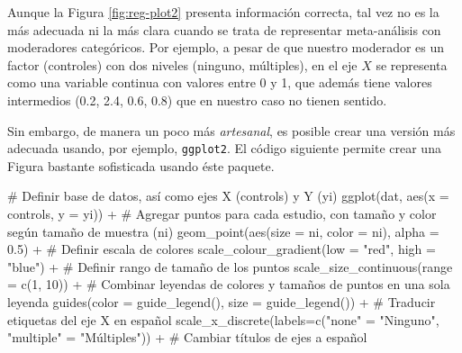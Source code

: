 \documentclass[
  bookmarksnumbered]{article}
\newenvironment{Shaded}{\begin{snugshade}}{\end{snugshade}}
\newcommand{\AttributeTok}[1]{\textcolor[rgb]{0.00,0.34,0.68}{#1}}
\newcommand{\CommentTok}[1]{\textcolor[rgb]{0.54,0.53,0.53}{#1}}
\newcommand{\DecValTok}[1]{\textcolor[rgb]{0.69,0.50,0.00}{#1}}
\newcommand{\FloatTok}[1]{\textcolor[rgb]{0.69,0.50,0.00}{#1}}
\newcommand{\FunctionTok}[1]{\textcolor[rgb]{0.39,0.29,0.61}{#1}}
\newcommand{\NormalTok}[1]{\textcolor[rgb]{0.12,0.11,0.11}{#1}}
\newcommand{\OtherTok}[1]{\textcolor[rgb]{0.00,0.43,0.16}{#1}}
\newcommand{\SpecialCharTok}[1]{\textcolor[rgb]{0.24,0.68,0.91}{#1}}
\newcommand{\StringTok}[1]{\textcolor[rgb]{0.75,0.01,0.01}{#1}}
\begin{document}
Aunque la Figura \ref{fig:reg-plot2} presenta información correcta, tal vez no es la más adecuada ni la más clara cuando se trata de representar meta-análisis con moderadores categóricos. Por ejemplo, a pesar de que nuestro moderador es un factor (controles) con dos niveles (ninguno, múltiples), en el eje \(X\) se representa como una variable continua con valores entre 0 y 1, que además tiene valores intermedios (0.2, 2.4, 0.6, 0.8) que en nuestro caso no tienen sentido.

Sin embargo, de manera un poco más \emph{artesanal}, es posible crear una versión más adecuada usando, por ejemplo, \texttt{ggplot2}. El código siguiente permite crear una Figura bastante sofisticada usando éste paquete.

\begin{Shaded}
\begin{Highlighting}[]
\CommentTok{\# Definir base de datos, así como ejes X (controls) y Y (yi)}
\FunctionTok{ggplot}\NormalTok{(dat, }\FunctionTok{aes}\NormalTok{(}\AttributeTok{x =}\NormalTok{ controls, }\AttributeTok{y =}\NormalTok{ yi)) }\SpecialCharTok{+}
  \CommentTok{\# Agregar puntos para cada estudio, con tamaño y color según tamaño de muestra (ni)}
  \FunctionTok{geom\_point}\NormalTok{(}\FunctionTok{aes}\NormalTok{(}\AttributeTok{size =}\NormalTok{ ni, }\AttributeTok{color =}\NormalTok{ ni),}
             \AttributeTok{alpha =} \FloatTok{0.5}\NormalTok{) }\SpecialCharTok{+}
  \CommentTok{\# Definir escala de colores}
  \FunctionTok{scale\_colour\_gradient}\NormalTok{(}\AttributeTok{low =} \StringTok{"red"}\NormalTok{,}
                        \AttributeTok{high =} \StringTok{"blue"}\NormalTok{) }\SpecialCharTok{+}
  \CommentTok{\# Definir rango de tamaño de los puntos}
  \FunctionTok{scale\_size\_continuous}\NormalTok{(}\AttributeTok{range =} \FunctionTok{c}\NormalTok{(}\DecValTok{1}\NormalTok{, }\DecValTok{10}\NormalTok{)) }\SpecialCharTok{+}
  \CommentTok{\# Combinar leyendas de colores y tamaños de puntos en una sola leyenda}
  \FunctionTok{guides}\NormalTok{(}\AttributeTok{color =} \FunctionTok{guide\_legend}\NormalTok{(), }
         \AttributeTok{size =} \FunctionTok{guide\_legend}\NormalTok{()) }\SpecialCharTok{+}
  \CommentTok{\# Traducir etiquetas del eje X en español}
  \FunctionTok{scale\_x\_discrete}\NormalTok{(}\AttributeTok{labels=}\FunctionTok{c}\NormalTok{(}\StringTok{"none"} \OtherTok{=} \StringTok{"Ninguno"}\NormalTok{, }
                            \StringTok{"multiple"} \OtherTok{=} \StringTok{"Múltiples"}\NormalTok{)) }\SpecialCharTok{+}
  \CommentTok{\# Cambiar títulos de ejes a español}

\end{Highlighting}
\end{Shaded}
\end{document}
